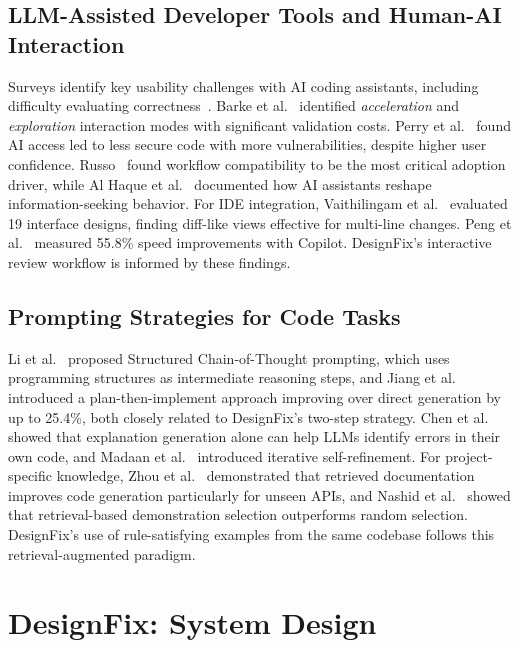 \documentclass[conference]{IEEEtran}
\begin{document}
\subsection{LLM-Assisted Developer Tools and Human-AI Interaction}

Surveys identify key usability challenges with AI coding assistants, including difficulty evaluating correctness~\cite{liang2024survey}. Barke et al.~\cite{barke2023grounded} identified \emph{acceleration} and \emph{exploration} interaction modes with significant validation costs. Perry et al.~\cite{perry2023insecure} found AI access led to less secure code with more vulnerabilities, despite higher user confidence. Russo~\cite{russo2024navigating} found workflow compatibility to be the most critical adoption driver, while Al Haque et al.~\cite{alhaque2025evolution} documented how AI assistants reshape information-seeking behavior. For IDE integration, Vaithilingam et al.~\cite{vaithilingam2023intellicode} evaluated 19 interface designs, finding diff-like views effective for multi-line changes. Peng et al.~\cite{peng2023impact} measured 55.8\% speed improvements with Copilot. DesignFix's interactive review workflow is informed by these findings.

\subsection{Prompting Strategies for Code Tasks}

Li et al.~\cite{li2024scot} proposed Structured Chain-of-Thought prompting, which uses programming structures as intermediate reasoning steps, and Jiang et al.~\cite{jiang2024selfplanning} introduced a plan-then-implement approach improving over direct generation by up to 25.4\%, both closely related to DesignFix's two-step strategy. Chen et al.~\cite{chen2024selfdebug} showed that explanation generation alone can help LLMs identify errors in their own code, and Madaan et al.~\cite{madaan2023selfrefine} introduced iterative self-refinement. For project-specific knowledge, Zhou et al.~\cite{zhou2023docprompting} demonstrated that retrieved documentation improves code generation particularly for unseen APIs, and Nashid et al.~\cite{nashid2023cedar} showed that retrieval-based demonstration selection outperforms random selection. DesignFix's use of rule-satisfying examples from the same codebase follows this retrieval-augmented paradigm.



\section{DesignFix: System Design}
\end{document}
